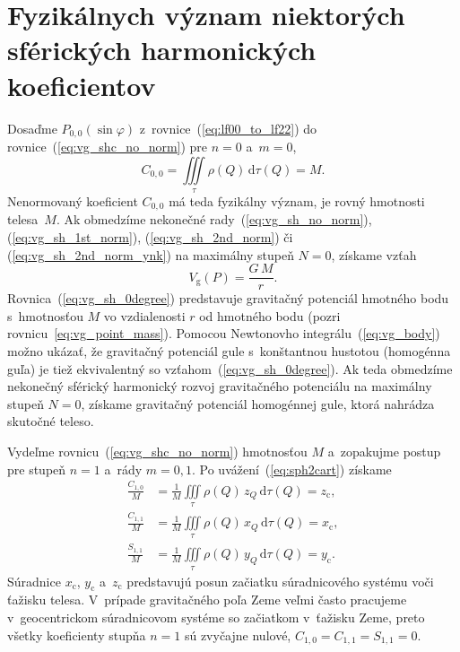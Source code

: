 \documentclass[a4paper,12pt]{book}
\newcommand{\diff}{\mathrm d}
\newcommand{\gidx}{\mathrm g}
\begin{document}

\section{Fyzikálnych význam niektorých sférických harmonických koeficientov}
\label{sec:physical_meaning_of_spherical_harmonic_coefficients}

Dosaďme $P_{0,0}(\sin\varphi)$ z~rovnice~(\ref{eq:lf00_to_lf22})
do rovnice~(\ref{eq:vg_shc_no_norm}) pre $n = 0$ a~$m = 0$,
%
\begin{equation}
C_{0,0} = \iiint\limits_{\tau} \rho(Q) \, \diff \tau(Q) = M{.}
\end{equation}
%
Nenormovaný koeficient $C_{0,0}$ má teda fyzikálny význam, je rovný hmotnosti 
telesa~$M$.  Ak obmedzíme nekonečné rady~(\ref{eq:vg_sh_no_norm}), 
(\ref{eq:vg_sh_1st_norm}), (\ref{eq:vg_sh_2nd_norm}) či 
(\ref{eq:vg_sh_2nd_norm_ynk}) na maximálny stupeň $N = 0$, získame vzťah
%
\begin{equation}
\label{eq:vg_sh_0degree}
V_\gidx(P) = \frac{G \, M}{r}{.}
\end{equation}
%
Rovnica~(\ref{eq:vg_sh_0degree}) predstavuje gravitačný potenciál hmotného bodu
s~hmotnosťou $M$ vo vzdialenosti $r$ od hmotného bodu (pozri
rovnicu~\ref{eq:vg_point_mass}).  Pomocou Newtonovho
integrálu~(\ref{eq:vg_body}) možno ukázať, že gravitačný potenciál gule
s~konštantnou hustotou (homogénna guľa) je tiež ekvivalentný so
vzťahom~(\ref{eq:vg_sh_0degree}).  Ak teda obmedzíme nekonečný sférický
harmonický rozvoj gravitačného potenciálu na maximálny stupeň $N = 0$, získame
gravitačný potenciál homogénnej gule, ktorá nahrádza skutočné teleso.

Vydeľme rovnicu~(\ref{eq:vg_shc_no_norm}) hmotnosťou $M$ a~zopakujme postup pre
stupeň $n = 1$ a~rády $m = 0, 1$.  Po uvážení~(\ref{eq:sph2cart}) získame
%
\begin{equation}
\begin{split}
\frac{C_{1,0}}{M} &= \frac{1}{M} \iiint\limits_{\tau} \rho(Q) \, z_Q \, \diff 
\tau(Q) = z_\mathrm{c}{,}\\
\frac{C_{1,1}}{M} &= \frac{1}{M} \iiint\limits_{\tau} \rho(Q) \, x_Q \, \diff 
\tau(Q) = x_\mathrm{c}{,}\\
\frac{S_{1,1}}{M} &= \frac{1}{M} \iiint\limits_{\tau} \rho(Q) \, y_Q \, \diff 
\tau(Q) = y_\mathrm{c}{.}
\end{split}
\end{equation}
%
Súradnice $x_\mathrm{c}$, $y_\mathrm{c}$ a~$z_\mathrm{c}$ predstavujú posun
začiatku súradnicového systému voči ťažisku telesa.  V~prípade gravitačného
poľa Zeme veľmi často pracujeme v~geocentrickom súradnicovom systéme so
začiatkom v~ťažisku Zeme, preto všetky koeficienty stupňa $n = 1$ sú zvyčajne
nulové, $C_{1,0} = C_{1,1} = S_{1,1} = 0$.
\end{document}
